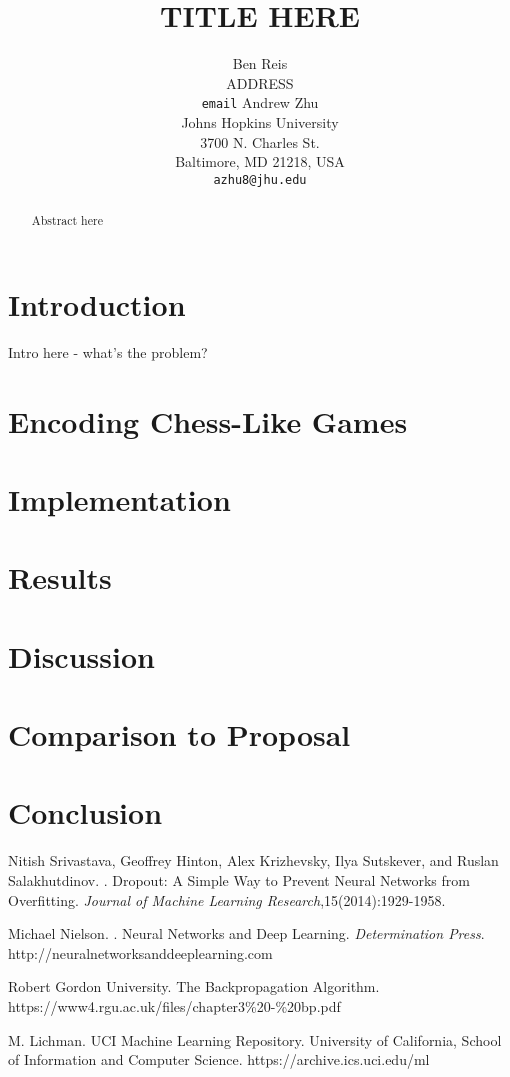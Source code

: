 \documentclass[11pt,letterpaper]{article}
\title{TITLE HERE}
\author{Ben Reis \\
  ADDRESS \\
  {\tt email}
  \And
  Andrew Zhu \\
  Johns Hopkins University \\
  3700 N. Charles St. \\
  Baltimore, MD 21218, USA\\
  {\tt azhu8@jhu.edu}}
\date{}
\begin{document}
\maketitle
\begin{abstract}
  Abstract here
\end{abstract}

\section{Introduction}
Intro here - what's the problem?

\section{Encoding Chess-Like Games}

\section{Implementation}

\section{Results}

\section{Discussion}


\section{Comparison to Proposal}


\section{Conclusion}



\begin{thebibliography}{}

Nitish Srivastava, Geoffrey Hinton, Alex Krizhevsky, Ilya Sutskever, and Ruslan Salakhutdinov.
.
\newblock Dropout: A Simple Way to Prevent Neural Networks from Overfitting. {\em Journal of Machine Learning Research},15(2014):1929-1958.

Michael Nielson.
.
\newblock Neural Networks and Deep Learning. {\em Determination Press}.
\newblock http://neuralnetworksanddeeplearning.com

Robert Gordon University.
\newblock The Backpropagation Algorithm.
\newblock https://www4.rgu.ac.uk/files/chapter3\%20-\%20bp.pdf

M. Lichman.
\newblock UCI Machine Learning Repository.
\newblock University of California, School of Information and Computer Science.
\newblock https://archive.ics.uci.edu/ml
\end{thebibliography}
\end{document}
